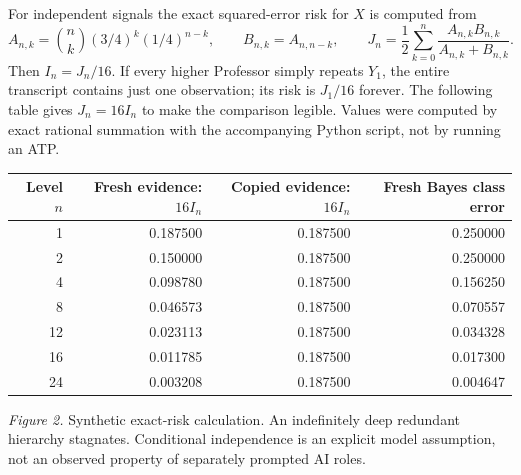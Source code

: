\documentclass[11pt,letterpaper]{article}
\theoremstyle{definition}\newtheorem{definition}[theorem]{Definition}\newtheorem{example}[theorem]{Example}\newtheorem{conjecture}[theorem]{Conjecture}
\begin{document}
For independent signals the exact squared-error risk for $X$ is computed from
\[
 A_{n,k}=\binom nk(3/4)^k(1/4)^{n-k},\qquad B_{n,k}=A_{n,n-k},
 \qquad J_n=\frac12\sum_{k=0}^n\frac{A_{n,k}B_{n,k}}{A_{n,k}+B_{n,k}}.
\]
Then $I_n=J_n/16$. If every higher Professor simply repeats $Y_1$, the entire transcript contains just one observation; its risk is $J_1/16$ forever. The following table gives $J_n=16I_n$ to make the comparison legible. Values were computed by exact rational summation with the accompanying Python script, not by running an ATP.
\begin{center}
\begin{tabular}{r rr r}
\toprule
Level $n$ & Fresh evidence: $16 I_n$ & Copied evidence: $16 I_n$ & Fresh Bayes class error\\
\midrule
1 & 0.187500 & 0.187500 & 0.250000\\
2 & 0.150000 & 0.187500 & 0.250000\\
4 & 0.098780 & 0.187500 & 0.156250\\
8 & 0.046573 & 0.187500 & 0.070557\\
12 & 0.023113 & 0.187500 & 0.034328\\
16 & 0.011785 & 0.187500 & 0.017300\\
24 & 0.003208 & 0.187500 & 0.004647\\
\bottomrule
\end{tabular}
\end{center}
\begin{samepage}
\begin{center}
\end{center}
\textit{Figure 2.} Synthetic exact-risk calculation. An indefinitely deep redundant hierarchy stagnates. Conditional independence is an explicit model assumption, not an observed property of separately prompted AI roles.
\end{samepage}
\end{document}
